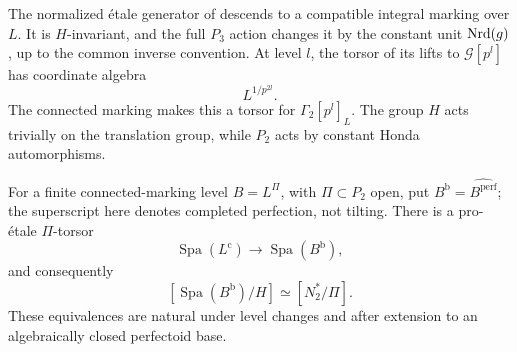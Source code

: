 \begin{lemma}\label{h3:lem:marking-descent}
The normalized \'etale generator of
 descends to a compatible integral
marking over $L$.  It is $H$-invariant, and the full $P_3$ action
changes it by the constant unit $\operatorname{Nrd}(g)$, up to the common inverse
convention.  At level $l$, the torsor of its lifts to
$\mathcal G[p^l]$ has coordinate algebra
\begin{equation}\label{h3:geom:height-two-roots}
 L^{1/p^{2l}}.
\end{equation}
The connected marking makes this a torsor for
$\Gamma_2[p^l]_L$.  The group $H$ acts trivially on the translation
group, while $P_2$ acts by constant Honda automorphisms.

For a finite connected-marking level $B=L^\Pi$, with $\Pi\subset P_2$
open, put $B^{\mathrm b}=\widehat{B^{\mathrm{perf}}}$; the superscript
here denotes completed perfection, not tilting.  There is a
pro-\'etale $\Pi$-torsor
\begin{equation}\label{h3:geom:completed-level-torsor}
 \operatorname{Spa}(L^{\mathrm c})\longrightarrow
 \operatorname{Spa}(B^{\mathrm b}),
\end{equation}
and consequently
\begin{equation}\label{h3:geom:finite-level-stack}
 [\operatorname{Spa}(B^{\mathrm b})/H]\simeq[N_2^*/\Pi].
\end{equation}
These equivalences are natural under level changes and after
extension to an algebraically closed perfectoid base.
\end{lemma}

